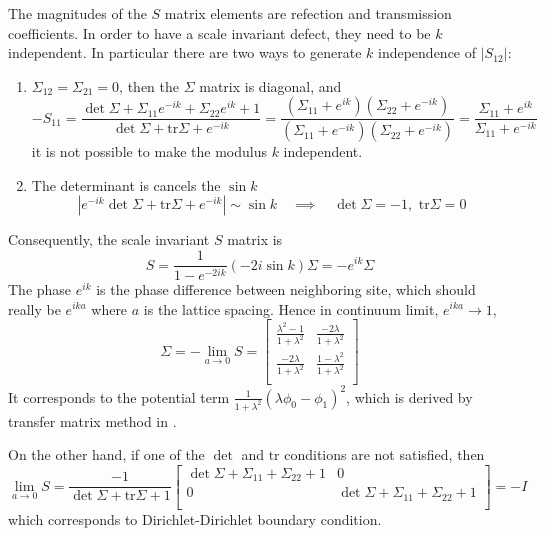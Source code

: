 \documentclass{article}
\begin{document}
The magnitudes of the $S$ matrix elements are refection and transmission coefficients. In order to have a scale invariant defect, they need to be $k$ independent. In particular there are two ways to generate $k$ independence of $|S_{12}|$:
\begin{enumerate}
\item $\Sigma_{12} = \Sigma_{21} = 0$, then the $\Sigma$ matrix is diagonal, and 
\begin{equation}
  -S_{11} = \frac{\det \Sigma + \Sigma_{11} e^{-ik} + \Sigma_{22} e^{ik} + 1}{\det \Sigma + \text{tr} \Sigma + e^{-ik} } = \frac{(\Sigma_{11} + e^{ik})(\Sigma_{22} + e^{-ik} ) }{(\Sigma_{11} + e^{-ik})(\Sigma_{22} + e^{-ik} ) }= \frac{\Sigma_{11} + e^{ik} }{\Sigma_{11} + e^{-ik} }
\end{equation}
it is not possible to make the modulus $k$ independent.
\item The determinant is cancels the $\sin k$
\begin{equation}
|e^{-ik} \det \Sigma + \text{tr} \Sigma + e^{-ik } | \sim \sin k \quad \implies \quad \det \Sigma = -1, \, \, \text{tr} \Sigma = 0
\end{equation}
\end{enumerate}
Consequently, the scale invariant $S$ matrix is
\begin{equation}
S = \frac{1}{1 - e^{-2ik } } ( -2i \sin k ) \Sigma
 = - e^{ik} \Sigma
\end{equation}
The phase $e^{ik}$ is the phase difference between neighboring site, which should really be $e^{ika}$ where $a$ is the lattice spacing. Hence in continuum limit, $e^{ik a} \rightarrow 1$,
\begin{equation}
\Sigma = -\lim_{a \rightarrow 0 } S = 
\begin{bmatrix}
\frac{\lambda^2- 1}{1 + \lambda^2} & \frac{-2\lambda }{1 + \lambda^2} \\
\frac{-2\lambda }{1 + \lambda^2} & \frac{1- \lambda^2}{1 + \lambda^2} \\
\end{bmatrix}
\end{equation}
It corresponds to the potential term $\frac{1}{1+ \lambda^2}( \lambda \phi_0 - \phi_1 ) ^2 $, which is derived by transfer matrix method in \cite{peschel_exact_2012}.

On the other hand, if one of the $\det$ and $\text{tr}$ conditions are not satisfied, then
\begin{equation}
\lim_{a \rightarrow 0 } S = \frac{-1}{\det \Sigma  + \text{tr} \Sigma   + 1}
\begin{bmatrix}
 \det \Sigma+ \Sigma_{11}  + \Sigma_{22} +1  & 0  \\
0 &   \det \Sigma+ \Sigma_{11} + \Sigma_{22} +1 \\
\end{bmatrix} = - I 
\end{equation}
which corresponds to Dirichlet-Dirichlet boundary condition. 
\end{document}
